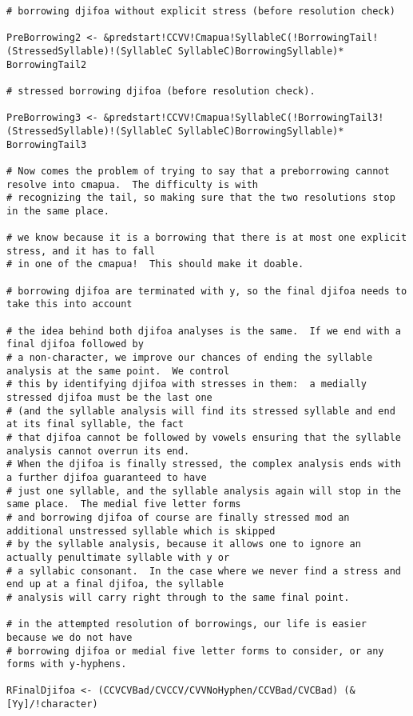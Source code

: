 \documentclass[12pt]{book}
\begin{document}
{\begin{verbatim}
# borrowing djifoa without explicit stress (before resolution check)

PreBorrowing2 <- &predstart!CCVV!Cmapua!SyllableC(!BorrowingTail!(StressedSyllable)!(SyllableC SyllableC)BorrowingSyllable)* BorrowingTail2

# stressed borrowing djifoa (before resolution check).

PreBorrowing3 <- &predstart!CCVV!Cmapua!SyllableC(!BorrowingTail3!(StressedSyllable)!(SyllableC SyllableC)BorrowingSyllable)* BorrowingTail3

# Now comes the problem of trying to say that a preborrowing cannot resolve into cmapua.  The difficulty is with
# recognizing the tail, so making sure that the two resolutions stop in the same place.

# we know because it is a borrowing that there is at most one explicit stress, and it has to fall
# in one of the cmapua!  This should make it doable.

# borrowing djifoa are terminated with y, so the final djifoa needs to take this into account

# the idea behind both djifoa analyses is the same.  If we end with a final djifoa followed by
# a non-character, we improve our chances of ending the syllable analysis at the same point.  We control
# this by identifying djifoa with stresses in them:  a medially stressed djifoa must be the last one
# (and the syllable analysis will find its stressed syllable and end at its final syllable, the fact
# that djifoa cannot be followed by vowels ensuring that the syllable analysis cannot overrun its end.
# When the djifoa is finally stressed, the complex analysis ends with a further djifoa guaranteed to have
# just one syllable, and the syllable analysis again will stop in the same place.  The medial five letter forms
# and borrowing djifoa of course are finally stressed mod an additional unstressed syllable which is skipped
# by the syllable analysis, because it allows one to ignore an actually penultimate syllable with y or 
# a syllabic consonant.  In the case where we never find a stress and end up at a final djifoa, the syllable
# analysis will carry right through to the same final point.

# in the attempted resolution of borrowings, our life is easier because we do not have
# borrowing djifoa or medial five letter forms to consider, or any forms with y-hyphens.

RFinalDjifoa <- (CCVCVBad/CVCCV/CVVNoHyphen/CCVBad/CVCBad) (&[Yy]/!character)


\end{verbatim}}
\end{document}
